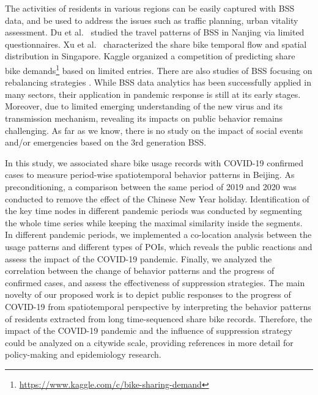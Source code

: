 \documentclass[ijgi,submit,moreauthors,pdftex]{Definitions/mdpi}
\begin{document}
The activities of residents in various regions can be easily captured with BSS data, and be used to address the issues such as traffic planning, urban vitality assessment.
Du et al.\ \cite{du2018better} studied the travel patterns of BSS in Nanjing via limited questionnaires.
Xu et al.\ \cite{xu2019unravel} characterized the share bike temporal flow and spatial distribution in Singapore.
Kaggle organized a competition of predicting share bike demands\footnote{\url{https://www.kaggle.com/c/bike-sharing-demand}} based on limited entries.
There are also studies of BSS focusing on rebalancing strategies \cite{pal2017free, ai2019deep,chen2016dynamic}.
While BSS data analytics has been successfully applied in many sectors, their application in pandemic response is still at its early stages.
Moreover, due to limited emerging understanding of the new virus and its transmission mechanism, revealing its impacts on public behavior remains challenging.
As far as we know, there is no study on the impact of social events and/or emergencies based on the 3rd generation BSS.

In this study, we associated share bike usage records with COVID-19 confirmed cases to measure period-wise spatiotemporal behavior patterns in Beijing. 
As preconditioning, a comparison between the same period of 2019 and 2020 was conducted to remove the effect of the Chinese New Year holiday. 
Identification of the key time nodes in different pandemic periods was conducted by segmenting the whole time series while keeping the maximal similarity inside the segments.
In different pandemic periods, we implemented a co-location analysis between the usage patterns and different types of POIs, which reveals the public reactions and assess the impact of the COVID-19 pandemic.
Finally, we analyzed the correlation between the change of behavior patterns and the progress of confirmed cases, and assess the effectiveness of suppression strategies.
The main novelty of our proposed work is to depict public responses to the progress of COVID-19 from spatiotemporal perspective by interpreting the behavior patterns of residents extracted from long time-sequenced share bike records. 
Therefore, the impact of the COVID-19 pandemic and the influence of suppression strategy could be analyzed on a citywide scale, providing references in more detail for policy-making and epidemiology research. 
\end{document}
